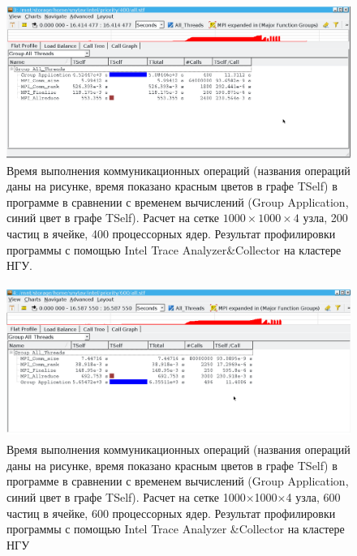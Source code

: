 	   
\begin{figure}[h]
	\begin{center}
		\includegraphics[height=5cm,keepaspectratio]{images/scalingNSU-img20.png}
		\caption{
			Время выполнения коммуникационных операций (названия операций даны на рисунке, время показано красным цветов в графе TSelf) в программе в сравнении с временем вычислений (Group Application, синий цвет в графе TSelf). Расчет на сетке $1000  \times 1000 \times 4$ узла, 200 частиц в ячейке, 400 процессорных ядер. Результат профилировки программы с помощью Intel Trace Analyzer\&Collector на кластере НГУ.
		}
		\label{scale9a}
	\end{center} 
\end{figure}	    
	    
	    
	   

\begin{figure}[h]
	\begin{center}
		\includegraphics[height=5cm,keepaspectratio]{images/scalingNSU-img21.png}
		\caption{
		Время выполнения коммуникационных операций (названия операций даны на рисунке, время показано красным цветов в графе TSelf) в программе в сравнении с временем вычислений (Group Application, синий цвет в графе TSelf). Расчет на сетке 1000×1000×4 узла, 600 частиц в ячейке, 600 процессорных ядер. Результат профилировки программы с помощью Intel Trace Analyzer \&Collector на кластере НГУ
		}
		\label{scale10}
	\end{center} 
\end{figure}
	 

